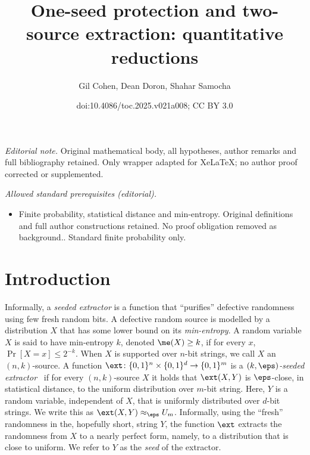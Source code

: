 \documentclass[11pt]{article}
\title{One-seed protection and two-source extraction: quantitative reductions}
\author{Gil Cohen, Dean Doron, Shahar Samocha}
\date{doi:10.4086/toc.2025.v021a008; CC BY 3.0}
\numberwithin{equation}{section}
\theoremstyle{definition}
\theoremstyle{plain}
\begin{document}
\maketitle
\noindent\textit{Editorial note.} Original mathematical body, all hypotheses, author remarks and full bibliography retained. Only wrapper adapted for XeLaTeX; no author proof corrected or supplemented.\par\medskip
\noindent\textit{Allowed standard prerequisites (editorial).}\begin{itemize}
\item Finite probability, statistical distance and min-entropy. Original definitions and full author constructions retained. No proof obligation removed as background.. Standard finite probability only.
\end{itemize}\medskip

%
%
%


\section{Introduction}


Informally, a \emph{seeded extractor} is a function that ``purifies'' defective randomness using few fresh  random bits. A defective random source is modelled by a distribution $X$ that has some
%
 lower bound on its \emph{min-entropy}. A random variable $X$ is said to have min-entropy $k$, denoted $\me(X) \ge k$, if for every $x$, $\Pr[X = x] \le 2^{-k}$.  When $X$ is supported over $n$-bit strings, we call $X$ an $(n,k)$-source. A function $\ext \colon \{0,1\}^n \times \{0,1\}^d \to \{0,1\}^m$ is a \emph{$(k,\eps)$-seeded extractor}~\cite{NZ96} if for every $(n,k)$-source $X$ it holds that $\ext(X,Y)$ is $\eps$-close, in statistical distance, to the uniform distribution over $m$-bit string. Here, $Y$ is a random variable, independent of $X$, that is uniformly distributed over $d$-bit strings. We write this as $\ext(X,Y) \approx_\eps U_m$. Informally, using the ``fresh'' randomness in the,
%
hopefully short, %
string $Y$, the function $\ext$ extracts the randomness from $X$ to a nearly perfect form, namely, to a distribution that is close to uniform. We refer to $Y$ as the \emph{seed} of the extractor.
\end{document}
